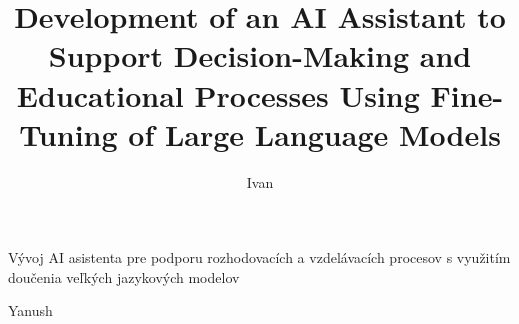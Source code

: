 


\title{Development of an AI Assistant to Support Decision-Making and Educational Processes Using Fine-Tuning of Large Language Models}{Vývoj AI asistenta pre podporu rozhodovacích a vzdelávacích procesov s využitím doučenia veľkých jazykových modelov}

\author{Ivan}{Yanush}


\makeatletter
\def\cestnevyhlasenie{\thispagestyle{empty}\vglue0pt
\vfill
\noindent\textbf{Čestné vyhlásenie}

\bigskip

Vyhlasujem, že som záverečnú prácu vypracoval samostatne s použitím uvedenej odbornej literatúry, ako aj s využitím nástrojov generatívnej umelej inteligencie v súlade s Metodickým pokynom o záverečných a kvalifikačných prácach a Etickým kódexom študenta Technickej univerzity v Košiciach. Umelá inteligencia bola použitá ako podporný nástroj bez porušenia zásad akademickej etiky a autorskej integrity.

\bigskip

\noindent \@college@city~\@submissionday.\@submissionmonth.\@submissionyear \hfill
{\setlength\tabcolsep{0pt}\begin{tabular}[t]{c}
\hbox to 50mm {\dotfill} \ \textit{\small Vlastnoručný podpis}
\end{tabular}}
\newpage
}
\makeatother
\renewcommand{\declarationpage}{\cestnevyhlasenie}

